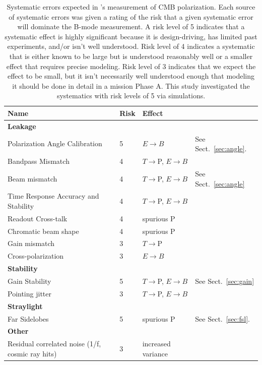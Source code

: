 \documentclass[PICOReport.tex]{subfiles}
\begin{document}
\begin{table}[h!]
\hspace{-0.1in}
\parbox{3.4in}{
\centering
\scriptsize
 \begin{tabular}{p{3.3cm} p{0.5cm} p{1.4cm} p{1.7cm}}
 \hline
\textbf{Name} & \textbf{Risk}&\textbf{Effect} \\
 \hline
\textbf{Leakage}& &\\
Polarization Angle Calibration\dotfill& 
5&
$E{\to}B$ &
See Sect.~\ref{sec:angle}.
\\
 Bandpass Mismatch\dotfill&
 4& 
$T{\to}$P, $E{\to}B$  
   \\
Beam mismatch\dotfill& 
4&
$T{\to}$P, $E{\to}B$
& See Sect.~\ref{sec:angle}
\\
Time Response Accuracy and Stability\dotfill&
4&
$T{\to}$P, $E{\to}B$
\\
Readout Cross-talk\dotfill& 
4&
spurious P
\\
Chromatic beam shape\dotfill&
4&
spurious P
\\

Gain mismatch\dotfill&
3&
$T{\to}$P   
\\


Cross-polarization\dotfill&
3&
$E{\to}B$
\\
\hline 
\textbf{Stability} & & \\
Gain Stability\dotfill& 
5&
$T{\to}$P, $E{\to} B$
& 
See Sect.~\ref{sec:gain}
\\
Pointing jitter\dotfill&
3&
$T{\to}$P, $E{\to}B$
\\

\hline
\textbf{Straylight}& & \\
Far Sidelobes\dotfill& 
5&
spurious P
&
See Sect.~\ref{sec:fsl}.\\
 \hline
\textbf{Other} \\
Residual correlated noise (1/f, cosmic ray hits)\dotfill&
3 &
increased variance
\\
\hline
 \end{tabular}
}
\hspace{-0.0in}
\parbox{3.1in}{
\caption{\label{tbl:SystematicsList2col} Systematic errors expected in \pico's measurement of CMB polarization. Each source of systematic errors was given a rating of the risk that a given systematic error will dominate the B-mode measurement.  A risk level of 5 indicates that a systematic effect is highly significant because it is design-driving, has limited past experiments, and/or isn't well understood.  Risk level of 4 indicates a systematic that is either known to be large but is understood reasonably well or a smaller effect that requires precise modeling.  Risk level of 3 indicates that we expect the effect to be small, but it isn't necessarily well understood enough that modeling it should be done in detail in a mission Phase A. This study investigated the systematics with risk levels of 5 via simulations.}}
\hspace{-0.0in}
\end{table}
\end{document}
